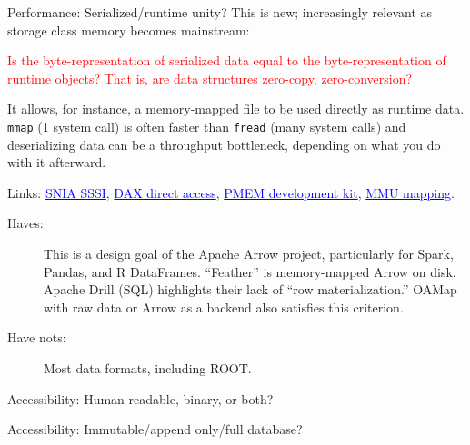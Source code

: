 \documentclass[aspectratio=169]{beamer}
\begin{document}
\begin{frame}{Performance: Serialized/runtime unity?}
\vspace{0.5 cm}
This is new; increasingly relevant as storage class memory becomes mainstream:

\begin{center}
\begin{minipage}{0.9\linewidth}
\textcolor{red}{Is the byte-representation of serialized data equal to the byte-representation of runtime objects? That is, are data structures zero-copy, zero-conversion?}
\end{minipage}
\end{center}

It allows, for instance, a memory-mapped file to be used directly as runtime data. {\tt\small mmap} (1 system call) is often faster than {\tt\small fread} (many system calls) and deserializing data can be a throughput bottleneck, depending on what you do with it afterward.

\vspace{0.25 cm}

Links: \href{https://www.snia.org/forums/sssi}{\textcolor{blue}{SNIA SSSI}}, \href{https://lwn.net/Articles/717953/}{\textcolor{blue}{DAX direct access}}, \href{https://pmem.io/}{\textcolor{blue}{PMEM development kit}}, \href{http://scitechconnect.elsevier.com/memory-management-unit/}{\textcolor{blue}{MMU mapping}}.

\vspace{0.15 cm}

\begin{description}
\item[Haves:] This is a design goal of the Apache Arrow project, particularly for Spark, Pandas, and R DataFrames. ``Feather'' is memory-mapped Arrow on disk. Apache Drill (SQL) highlights their lack of ``row materialization.'' OAMap with raw data or Arrow as a backend also satisfies this criterion.
\item[Have nots:] Most data formats, including ROOT.
\end{description}
\end{frame}

\begin{frame}{Accessibility: Human readable, binary, or both?}
\vspace{0.5 cm}
\end{frame}

\begin{frame}{Accessibility: Immutable/append only/full database?}
\vspace{0.5 cm}
\end{frame}
\end{document}
